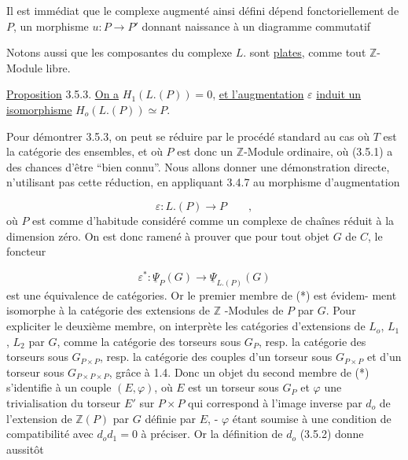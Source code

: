 Il est immédiat que le complexe augmenté ainsi défini dépend fonctoriellement de $P$, un morphisme $u : P \longrightarrow P'$ donnant naissance à un diagramme commutatif

\begin{center}
\end{center}
Notons aussi que les composantes du complexe $L.$ sont \underline{plates}, comme tout $\mathbb{Z}$-Module libre.

\underline{Proposition} 3.5.3. \underline{On a} $H_1(L.(P))=0$, \underline{et l'augmentation} $\varepsilon$ \underline{induit un isomorphisme} $H_o(L.(P)) \simeq P$.

Pour démontrer 3.5.3, on peut se réduire par le procédé standard au cas où \underline{$T$} est la catégorie des ensembles, et où $P$ est donc un $\mathbb{Z}$-Module ordinaire, où (3.5.1) a des chances d'être ``bien connu''. Nous allons donner une démonstration directe, n'utilisant pas cette réduction, en appliquant 3.4.7 au morphisme d'augmentation

\begin{equation*}
\varepsilon : L.(P) \longrightarrow P \qquad ,
\end{equation*}
où $P$ est comme d'habitude considéré comme un complexe de chaînes réduit à la dimension zéro. On est donc ramené à prouver que pour tout objet $G$ de \underline{$C$}, le foncteur

\begin{equation*}
\varepsilon^* : \underline{\Psi}_P(G) \longrightarrow \underline{\Psi}_{L.(P)}(G)
\end{equation*}
est une équivalence de catégories. Or le premier membre de (*) est évidem-
ment isomorphe à la catégorie des extensions de $\mathbb{Z}$ -Modules de $P$ par $G$. Pour expliciter le deuxième membre, on interprète les catégories d'extensions de $L_o$, $L_1$, $L_2$ par $G$, comme la catégorie des torseurs sous $G_P$, resp. la catégorie des torseurs sous $G_{P \times P}$, resp. la catégorie des couples d'un torseur sous $G_{P \times P}$ et d'un torseur sous $G_{P \times P \times P}$, grâce à 1.4. Donc un objet du second membre de (*) s'identifie à un couple $(E,\varphi)$, où $E$ est un torseur sous $G_P$ et $\varphi$ une trivialisation du torseur $E'$ sur $P \times P$ qui correspond à l'image inverse par $d_o$ de l'extension de $\mathbb{Z}(P)$ par $G$ définie par $E$, - $\varphi$ étant soumise à une condition de compatibilité avec $d_o d_1 = 0$ à préciser. Or la définition de $d_o$ (3.5.2) donne aussitôt

